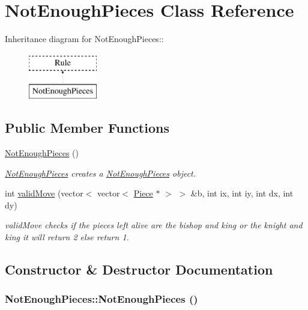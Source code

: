\hypertarget{classNotEnoughPieces}{
\section{NotEnoughPieces Class Reference}
\label{classNotEnoughPieces}
}
Inheritance diagram for NotEnoughPieces::\begin{figure}[H]
\begin{center}
\leavevmode
\includegraphics[height=2cm]{classNotEnoughPieces}
\end{center}
\end{figure}
\subsection*{Public Member Functions}
\begin{DoxyCompactItemize}
\item 
\hyperlink{classNotEnoughPieces_a854f2be1fd97be94a879d50c6e64f277}{NotEnoughPieces} ()
\begin{DoxyCompactList}\small\item\em \hyperlink{classNotEnoughPieces}{NotEnoughPieces} creates a \hyperlink{classNotEnoughPieces}{NotEnoughPieces} object. \item\end{DoxyCompactList}\item 
\hypertarget{classNotEnoughPieces_a30f5c2c61a8ba12a692dc818a8e99e49}{
int \hyperlink{classNotEnoughPieces_a30f5c2c61a8ba12a692dc818a8e99e49}{validMove} (vector$<$ vector$<$ \hyperlink{classPiece}{Piece} $\ast$ $>$ $>$ \&b, int ix, int iy, int dx, int dy)}
\label{classNotEnoughPieces_a30f5c2c61a8ba12a692dc818a8e99e49}

\begin{DoxyCompactList}\small\item\em validMove checks if the pieces left alive are the bishop and king or the knight and king it will return 2 else return 1. \item\end{DoxyCompactList}\end{DoxyCompactItemize}


\subsection{Constructor \& Destructor Documentation}
\hypertarget{classNotEnoughPieces_a854f2be1fd97be94a879d50c6e64f277}{
\subsubsection[{NotEnoughPieces}]{\setlength{\rightskip}{0pt plus 5cm}NotEnoughPieces::NotEnoughPieces ()}}
\label{classNotEnoughPieces_a854f2be1fd97be94a879d50c6e64f277}


